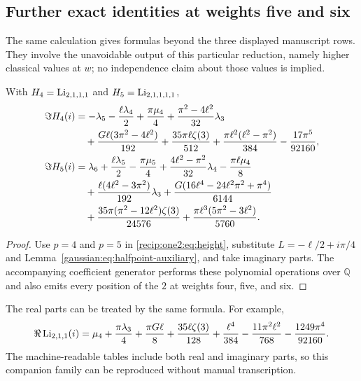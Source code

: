 \subsection{Further exact identities at weights five and six}

The same calculation gives formulas beyond the three displayed
manuscript rows.  They involve the unavoidable output of this
particular reduction, namely higher classical values at $w$; no
independence claim about those values is implied.

\begin{corollary}
\label{recip:one2:cor:56}
With $H_4=\operatorname{Li}_{2,1,1,1}$ and $H_5=\operatorname{Li}_{2,1,1,1,1}$,
\begin{align}
 \Im H_4(i)
 &=-\lambda_5-\frac{\ell\lambda_4}{2}+\frac{\pi\mu_4}{4}
       +\frac{\pi^2-4\ell^2}{32}\lambda_3\notag\\
 &\quad+\frac{G\ell(3\pi^2-4\ell^2)}{192}
       +\frac{35\pi\ell\zeta(3)}{512}
       +\frac{\pi\ell^2(\ell^2-\pi^2)}{384}
       -\frac{17\pi^5}{92160},
       \label{recip:one2:eq:H4}\\
 \Im H_5(i)
 &=\lambda_6+\frac{\ell\lambda_5}{2}-\frac{\pi\mu_5}{4}
       +\frac{4\ell^2-\pi^2}{32}\lambda_4
       -\frac{\pi\ell\mu_4}{8}\notag\\
 &\quad+\frac{\ell(4\ell^2-3\pi^2)}{192}\lambda_3
       +\frac{G(16\ell^4-24\ell^2\pi^2+\pi^4)}{6144}\notag\\
 &\quad+\frac{35\pi(\pi^2-12\ell^2)\zeta(3)}{24576}
       +\frac{\pi\ell^3(5\pi^2-3\ell^2)}{5760}.
       \label{recip:one2:eq:H5}
\end{align}
\end{corollary}
\begin{proof}
Use $p=4$ and $p=5$ in \eqref{recip:one2:eq:height}, substitute
$L=-\ell/2+i\pi/4$ and Lemma~\eqref{gaussian:eq:halfpoint-auxiliary}, and take
imaginary parts.  The accompanying coefficient generator performs
these polynomial operations over $\mathbb Q$ and also emits every
position of the $2$ at weights four, five, and six.
\end{proof}

The real parts can be treated by the same formula.  For example,
\begin{equation}
 \Re\operatorname{Li}_{2,1,1}(i)=\mu_4+\frac{\pi\lambda_3}{4}
 +\frac{\pi G\ell}{8}+\frac{35\ell\zeta(3)}{128}
 +\frac{\ell^4}{384}-\frac{11\pi^2\ell^2}{768}
 -\frac{1249\pi^4}{92160}.
 \label{recip:one2:eq:real211}
\end{equation}
The machine-readable tables include both real and imaginary parts,
so this companion family can be reproduced without manual
transcription.
